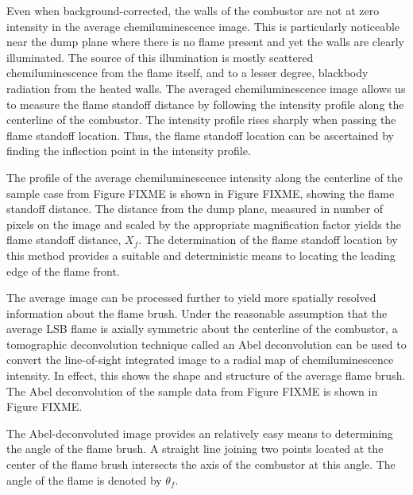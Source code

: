 Even when background-corrected, the walls of the combustor are not at zero intensity in the average chemiluminescence image.
This is particularly noticeable near the dump plane where there is no flame present and yet the walls are clearly illuminated.
The source of this illumination is mostly scattered chemiluminescence from the flame itself, and to a lesser degree, blackbody radiation from the heated walls.
The averaged chemiluminescence image allows us to measure the flame standoff distance by following the intensity profile along the centerline of the combustor.
The intensity profile rises sharply when passing the flame standoff location.
Thus, the flame standoff location can be ascertained by finding the inflection point in the intensity profile.

The profile of the average chemiluminescence intensity along the centerline of the sample case from Figure FIXME is shown in Figure FIXME, showing the flame standoff distance.
The distance from the dump plane, measured in number of pixels on the image and scaled by the appropriate magnification factor yields the flame standoff distance, \(X_f\).
The determination of the flame standoff location by this method provides a suitable and deterministic means to locating the leading edge of the flame front.

The average image can be processed further to yield more spatially resolved information about the flame brush.
Under the reasonable assumption that the average LSB flame is axially symmetric about the centerline of the combustor, a tomographic deconvolution technique called an Abel deconvolution\cite{1992-dasch} can be used to convert the line-of-sight integrated image to a radial map of chemiluminescence intensity.
In effect, this shows the shape and structure of the average flame brush.
The Abel deconvolution of the sample data from Figure FIXME is shown in Figure FIXME.

The Abel-deconvoluted image provides an relatively easy means to determining the angle of the flame brush.
A straight line joining two points located at the center of the flame brush intersects the axis of the combustor at this angle.
The angle of the flame is denoted by \(\theta_f\).

